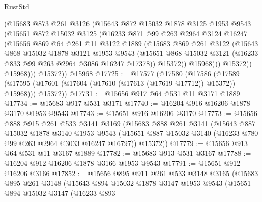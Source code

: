 \begin{lexlean}{RustStd}
\begin{coremodule}
              (@15683
                @873
                @261
                @3126
                (@15643
                  @872
                  @15032
                  @1878
                  @3125
                  @1953
                  @9543
                  (@15651
                    @872
                    @15032
                    @3125
                    (@16233
                      @871
                      @99
                      @263
                      @2964
                      @3124
                      @16247
                      (@15656
                        @869
                        @64
                        @261
                        @11
                        @3122
                        @1889
                        (@15683
                          @869
                          @261
                          @3122
                          (@15643
                            @868
                            @15032
                            @1878
                            @3121
                            @1953
                            @9543
                            (@15651
                              @868
                              @15032
                              @3121
                              (@16233 @833 @99 @263 @2964 @3086 @16247 @17378))
                            @15372))
                        @15968)))
                  @15372))
              @15968)))
        @15372))
    @15968
@17725 := @17577
    (@17580
      (@17586
        (@17589 (@17595 (@17601 (@17604 (@17610 (@17613 (@17619 @17712)) @15372)) @15968)))
        @15372))
@17731 := @15656 @917 @64 @531 @11 @3171 @1889
@17734 := @15683 @917 @531 @3171
@17740 := @16204 @916 @16206 @1878 @3170 @1953 @9543
@17743 := @15651 @916 @16206 @3170
@17773 := @15656
    @888
    @915
    @261
    @533
    @3141
    @3169
    (@15683
      @888
      @261
      @3141
      (@15643
        @887
        @15032
        @1878
        @3140
        @1953
        @9543
        (@15651 @887 @15032 @3140 (@16233 @780 @99 @263 @2964 @3033 @16247 @16797))
        @15372))
@17779 := @15656 @913 @64 @531 @11 @3167 @1889
@17782 := @15683 @913 @531 @3167
@17788 := @16204 @912 @16206 @1878 @3166 @1953 @9543
@17791 := @15651 @912 @16206 @3166
@17852 := @15656
    @895
    @911
    @261
    @533
    @3148
    @3165
    (@15683
      @895
      @261
      @3148
      (@15643
        @894
        @15032
        @1878
        @3147
        @1953
        @9543
        (@15651
          @894
          @15032
          @3147
          (@16233
            @893

\end{coremodule}
\end{lexlean}
